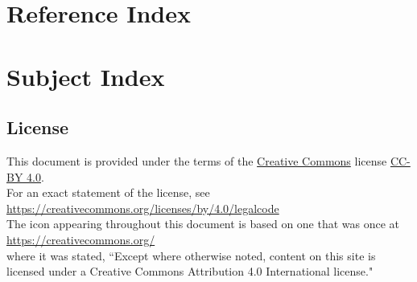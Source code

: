 ﻿%
%

\section*{Reference Index}
\begin{multicols}{3}

\end{multicols}
\section*{Subject Index}
\begin{multicols}{3}
  
\end{multicols}
\subsection*{License}
This document is provided under the terms of 
the \href{https://creativecommons.org/}{Creative Commons} license \href{https://creativecommons.org/licenses/by/4.0/legalcode}{CC-BY 4.0}.
\\For an exact statement of the license, see 
\\\indentx\url{https://creativecommons.org/licenses/by/4.0/legalcode}
\\
The icon 
appearing throughout this document is based on one that was once at 
\\\indentx\url{https://creativecommons.org/}\\
where it was stated, 
``Except where otherwise noted, content on this site is licensed under a Creative Commons Attribution 4.0 International license."
